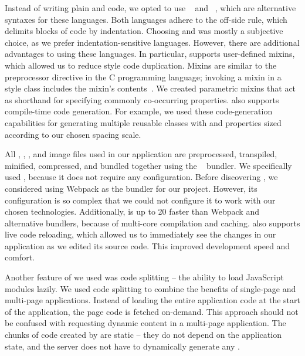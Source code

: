 Instead of writing plain  and  code, we opted to use ~\cite{pugjs} and ~\cite{stylus}, which are alternative syntaxes for these languages. Both languages adhere to the off-side rule, which delimits blocks of code by indentation. Choosing  and  was mostly a subjective choice, as we prefer indentation-sensitive languages. However, there are additional advantages to using these languages. In particular,  supports user-defined mixins, which allowed us to reduce style code duplication. Mixins are similar to the  preprocessor directive in the C programming language; invoking a mixin in a style class includes the mixin's contents~\cite{stylus_mixins}. We created parametric mixins that act as shorthand for specifying commonly co-occurring  properties.  also supports compile-time code generation. For example, we used these code-generation capabilities for generating multiple reusable classes with  and  properties sized according to our chosen spacing scale.

All , , , and image files used in our application are preprocessed, transpiled, minified, compressed, and bundled together using the ~\cite{parcel} bundler. We specifically used , because it does not require any configuration. Before discovering , we considered using Webpack as the bundler for our project. However, its configuration is so complex that we could not configure it to work with our chosen technologies. Additionally,  is up to 20 faster than Webpack and alternative bundlers, because of multi-core compilation and caching.  also supports live code reloading, which allowed us to immediately see the changes in our application as we edited its source code. This improved development speed and comfort.

Another feature of  we used was code splitting -- the ability to load JavaScript modules lazily. We used code splitting to combine the benefits of single-page and multi-page applications. Instead of loading the entire application code at the start of the application, the page code is fetched on-demand. This approach should not be confused with requesting dynamic content in a multi-page application. The chunks of code created by  are static -- they do not depend on the application state, and the server does not have to dynamically generate any .

